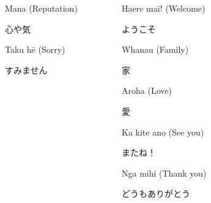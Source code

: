 \documentclass{beamer}
\begin{document}
\begin{frame}
\begin{columns}[T]
\begin{column}[T]{9cm}
{\begin{columns}[T]
\begin{column}[T]{4cm}
Mana (Reputation) \\ \begin{CJK}{UTF8}{min}心や気\end{CJK}
      \bigskip
   
Taku h\={e} (Sorry) \\ \begin{CJK}{UTF8}{min}すみません\end{CJK}
      
       \end{column}
        \begin{column}[T]{4cm}
   
Haere mai! (Welcome) \\ \begin{CJK}{UTF8}{min}ようこそ\end{CJK}
      \bigskip
   
Whanau (Family) \\ \begin{CJK}{UTF8}{min}家\end{CJK}
      \bigskip
   
Aroha (Love) \\ \begin{CJK}{UTF8}{min}愛\end{CJK}
      \bigskip
   
Ka kite ano (See you) \\ \begin{CJK}{UTF8}{min}またね！\end{CJK}
      \bigskip
   
  Nga mihi (Thank you) \\ \begin{CJK}{UTF8}{min}どうもありがとう\end{CJK}

   \end{column}
   \end{columns}
}
       \end{column} 
       \begin{column}[T]{3cm} %
      
\begin{center}
      
      \bigskip
      
  \end{center}
       \end{column}
     \end{columns}  
  
  \end{frame}
\end{document}
